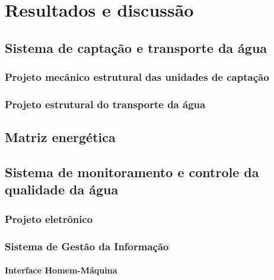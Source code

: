 \chapter[Resultados]{Resultados e discussão}
 
  \section{Sistema de captação e transporte da água}
  
    \subsection{Projeto mecânico estrutural das unidades de captação}
   
    
    \subsection{Projeto estrutural do transporte da água}
    
  \section{Matriz energética}
  
    
  \section{Sistema de monitoramento e controle da qualidade da água}
    
    \subsection{Projeto eletrônico}
    
      
    \subsection{Sistema de Gestão da Informação}
    
      
      \subsubsection{Interface Homem-Máquina}

    
    
    
    
    